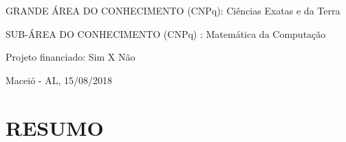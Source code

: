 \documentclass[12pt,letterpaper]{article}
\begin{document}
GRANDE ÁREA DO CONHECIMENTO (CNPq): Ciências  Exatas  e  da  Terra

SUB-ÁREA DO CONHECIMENTO (CNPq) : Matemática  da  Computação   

\vspace{0.5cm}

Projeto financiado:  \hspace*{1.5cm} Sim \hspace*{1.5cm} X Não

\vspace*{0.8cm}

\begin{center}

Maceió - AL, 15/08/2018

\end{center}


\newpage
\section*{\centering \textbf{RESUMO}} %
\end{document}
